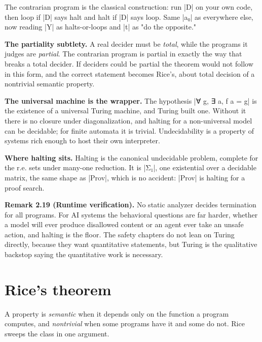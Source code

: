 \documentclass{memoir}
\begin{document}
The contrarian program is the classical construction: run \LeanVerb|D| on your own code,
then loop if \LeanVerb|D| says halt and halt if \LeanVerb|D| says loop. Same \LeanVerb|a₀| as everywhere
else, now reading \LeanVerb|Y| as halts-or-loops and \LeanVerb|t| as "do the opposite."

\textbf{The partiality subtlety.} A real decider must be \emph{total}, while the programs it
judges are \emph{partial}. The contrarian program is partial in exactly the way that
breaks a total decider. If deciders could be partial the theorem would not
follow in this form, and the correct statement becomes Rice's, about total
decision of a nontrivial semantic property.

\textbf{The universal machine is the wrapper.} The hypothesis \LeanVerb|∀ g, ∃ a, f a = g| is
the existence of a universal Turing machine, and Turing built one. Without it
there is no closure under diagonalization, and halting for a non-universal model
can be decidable; for finite automata it is trivial. Undecidability is a
property of systems rich enough to host their own interpreter.

\textbf{Where halting sits.} Halting is the canonical undecidable problem, complete for
the r.e. sets under many-one reduction. It is \LeanVerb|Σ₁|, one existential over a
decidable matrix, the same shape as \LeanVerb|Prov|, which is no accident: \LeanVerb|Prov| is
halting for a proof search.

\textbf{Remark 2.19 (Runtime verification).} No static analyzer decides termination for all
programs. For AI systems the behavioral questions are far harder, whether a
model will ever produce disallowed content or an agent ever take an unsafe
action, and halting is the floor. The safety chapters do not lean on Turing
directly, because they want quantitative statements, but Turing is the
qualitative backstop saying the quantitative work is necessary.



\section{Rice's theorem}\label{Two--Schemas--of--Impossibility-005F-005F-005F--Machine--Checked--Limits--of--Trustworthy--Machine--Learning-005F-005F-005F--and--Why--They--Tighten--with--Capability----The--Classical--Limits----Rice-005F-005F-005Fs--theorem}

A property is \emph{semantic} when it depends only on the function a program
computes, and \emph{nontrivial} when some programs have it and some do not. Rice
sweeps the class in one argument.
\end{document}
